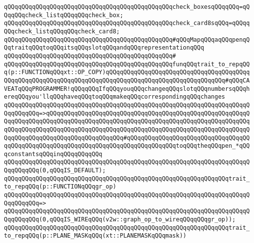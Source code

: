 \newline
\verb|qQQqqQQqqQQqqQQqqQQqqQQqqQQqqQQqqQQqqQQqqQQqqQQqcheck_boxesqQQqqQQq=qQQqqQQqcheck_listqQQqqQQqcheck_box;|\newline
\verb|qQQqqQQqqQQqqQQqqQQqqQQqqQQqqQQqqQQqqQQqqQQqqQQqcheck_card8sqQQq=qQQqqQQqcheck_listqQQqqQQqcheck_card8;|\newline
\newline
\newline
\verb|qQQqqQQqqQQqqQQqqQQqqQQqqQQqqQQqqQQqqQQqqQQqqQQq#qQQqMapqQQqaqQQqpenqQQqtraitqQQqtoqQQqitsqQQqslotqQQqandqQQqrepresentationqQQq|\newline
\verb|qQQqqQQqqQQqqQQqqQQqqQQqqQQqqQQqqQQqqQQqqQQqqQQq#|\newline
\verb|qQQqqQQqqQQqqQQqqQQqqQQqqQQqqQQqqQQqqQQqqQQqqQQqfunqQQqtrait_to_repqQQq(p::FUNCTIONqQQqxt::OP_COPY)qQQqqQQqqQQqqQQqqQQqqQQqqQQqqQQqqQQqqQQqqQQqqQQqqQQqqQQqqQQqqQQqqQQqqQQqqQQqqQQqqQQqqQQqqQQqqQQqqQQqqQQq#qQQqCAVEATqQQqPROGRAMMER!qQQqqQQqIfqQQqyouqQQqchangeqQQqslotqQQqnumbersqQQqhereqQQqyou'llqQQqhaveqQQqtoqQQqmakeqQQqcorrespondingqQQqchanges|\newline
\verb|qQQqqQQqqQQqqQQqqQQqqQQqqQQqqQQqqQQqqQQqqQQqqQQqqQQqqQQqqQQqqQQqqQQqqQQqqQQqqQQq=>qQQqqQQqqQQqqQQqqQQqqQQqqQQqqQQqqQQqqQQqqQQqqQQqqQQqqQQqqQQqqQQqqQQqqQQqqQQqqQQqqQQqqQQqqQQqqQQqqQQqqQQqqQQqqQQqqQQqqQQqqQQqqQQqqQQqqQQqqQQqqQQqqQQqqQQqqQQqqQQqqQQqqQQqqQQqqQQqqQQqqQQqqQQqqQQqqQQqqQQqqQQqqQQqqQQqqQQqqQQqqQQqqQQqqQQq#qQQqqQQqqQQqqQQqqQQqqQQqqQQqqQQqqQQqqQQqqQQqqQQqqQQqqQQqqQQqqQQqqQQqqQQqqQQqqQQqqQQqtoqQQqtheqQQqpen_*qQQqconstantsqQQqinqQQqqQQqqQQq|\newline
\verb|qQQqqQQqqQQqqQQqqQQqqQQqqQQqqQQqqQQqqQQqqQQqqQQqqQQqqQQqqQQqqQQqqQQqqQQqqQQqqQQq(0,qQQqIS_DEFAULT);|\newline
\newline
\verb|qQQqqQQqqQQqqQQqqQQqqQQqqQQqqQQqqQQqqQQqqQQqqQQqqQQqqQQqqQQqqQQqtrait_to_repqQQq(p::FUNCTIONqQQqgr_op)|\newline
\verb|qQQqqQQqqQQqqQQqqQQqqQQqqQQqqQQqqQQqqQQqqQQqqQQqqQQqqQQqqQQqqQQqqQQqqQQqqQQqqQQq=>|\newline
\verb|qQQqqQQqqQQqqQQqqQQqqQQqqQQqqQQqqQQqqQQqqQQqqQQqqQQqqQQqqQQqqQQqqQQqqQQqqQQqqQQq(0,qQQqIS_WIREqQQq(v2w::graph_op_to_wireqQQqqQQqgr_op));|\newline
\newline
\verb|qQQqqQQqqQQqqQQqqQQqqQQqqQQqqQQqqQQqqQQqqQQqqQQqqQQqqQQqqQQqqQQqtrait_to_repqQQq(p::PLANE_MASKqQQq(xt::PLANEMASKqQQqmask))|\newline
